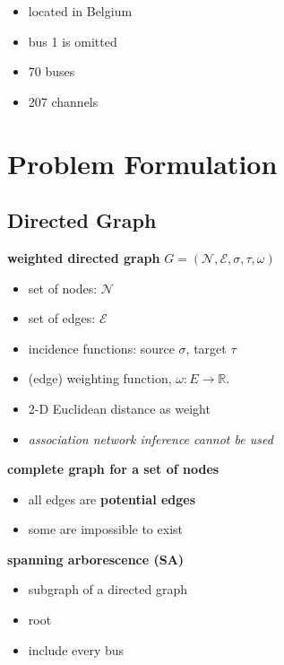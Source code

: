 \documentclass[
]{book}
\providecommand{\tightlist}{%
  \setlength{\itemsep}{0pt}\setlength{\parskip}{0pt}}
\begin{document}
\begin{itemize}
\tightlist
\item
  located in Belgium
\item
  bus 1 is omitted
\item
  70 buses
\item
  207 channels
\end{itemize}

\hypertarget{problem-formulation}{%
\chapter{Problem Formulation}\label{problem-formulation}}

\hypertarget{directed-graph}{%
\section{Directed Graph}\label{directed-graph}}

\textbf{weighted directed graph}
\(G = (\mathcal{N}, \mathcal{E}, \sigma, \tau, \omega)\)

\begin{itemize}
\tightlist
\item
  set of nodes: \(\mathcal{N}\)
\item
  set of edges: \(\mathcal{E}\)
\item
  incidence functions: source \(\sigma\), target \(\tau\)
\item
  (edge) weighting function, \(\omega: E \rightarrow \mathbb{R}\).
\item
  2-D Euclidean distance as weight
\item
  \emph{association network inference cannot be used}
\end{itemize}

\textbf{complete graph for a set of nodes}

\begin{itemize}
\tightlist
\item
  all edges are \textbf{potential edges}
\item
  some are impossible to exist
\end{itemize}

\textbf{spanning arborescence (SA)}

\begin{itemize}
\tightlist
\item
  subgraph of a directed graph
\item
  root
\item
  include every bus
\end{itemize}
\end{document}
